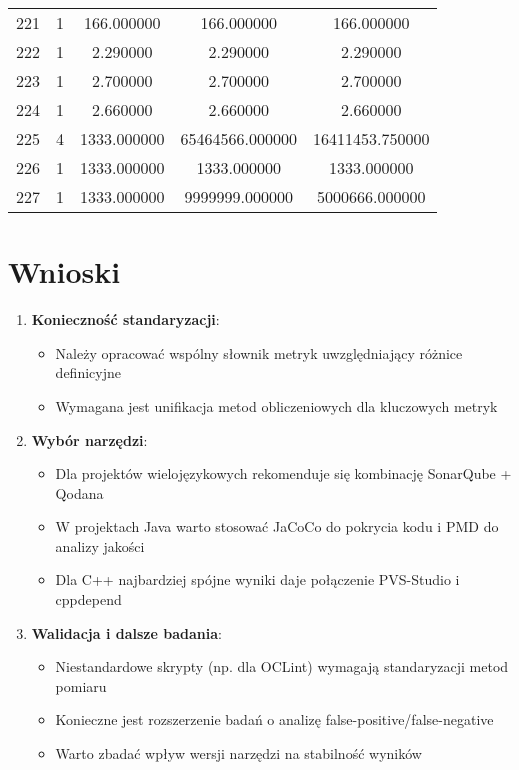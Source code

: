 \documentclass[a4paper,12pt]{article}
\begin{document}
\begin{center}
\begin{longtable}{l S[table-format=3.0] S[table-format=8.2] S[table-format=8.2] S[table-format=8.2]}
        221   &   1   &   166.000000   &    166.000000     &     166.000000 \\
        222   &   1   &     2.290000   &      2.290000     &       2.290000 \\
        223   &   1   &     2.700000   &      2.700000     &       2.700000 \\
        224   &   1   &     2.660000   &      2.660000     &       2.660000 \\
        225   &   4   &  1333.000000   &  65464566.000000   &  16411453.750000 \\
        226   &   1   &  1333.000000   &   1333.000000     &    1333.000000 \\
        227   &   1   &  1333.000000   &  9999999.000000    &  5000666.000000 \\
\end{longtable}
\end{center}


\section{Wnioski}

\begin{enumerate}
\item \textbf{Konieczność standaryzacji}:
\begin{itemize}
\item Należy opracować wspólny słownik metryk uwzględniający różnice definicyjne
\item Wymagana jest unifikacja metod obliczeniowych dla kluczowych metryk
\end{itemize}

\item \textbf{Wybór narzędzi}:
\begin{itemize}
\item Dla projektów wielojęzykowych rekomenduje się kombinację SonarQube + Qodana
\item W projektach Java warto stosować JaCoCo do pokrycia kodu i PMD do analizy jakości
\item Dla C++ najbardziej spójne wyniki daje połączenie PVS-Studio i cppdepend
\end{itemize}

\item \textbf{Walidacja i dalsze badania}:
\begin{itemize}
\item Niestandardowe skrypty (np. dla OCLint) wymagają standaryzacji metod pomiaru
\item Konieczne jest rozszerzenie badań o analizę false-positive/false-negative
\item Warto zbadać wpływ wersji narzędzi na stabilność wyników
\end{itemize}
\end{enumerate}
\end{document}
